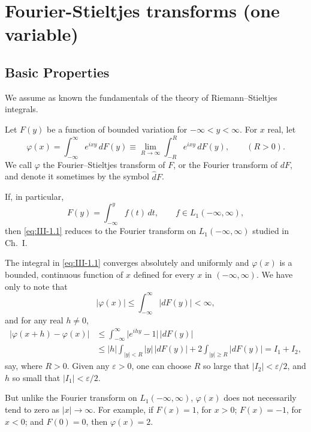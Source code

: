 \chapter{Fourier-Stieltjes transforms (one variable)}
\label{ch:III}

\section{Basic Properties}
\label{sec:III-1}

We assume as known the fundamentals of the theory of Riemann--Stieltjes integrals.

Let $F(y)$ be a function of bounded variation for $-\infty<y<\infty$. For $x$ real, let
\begin{equation}\tag{1.1}\label{eq:III-1.1}
\varphi(x)=\int_{-\infty}^{\infty}e^{ixy}\,dF(y)\equiv\lim_{R\to\infty}\int_{-R}^{R}e^{ixy}\,dF(y),\qquad(R>0).
\end{equation}
We call $\varphi$ the Fourier--Stieltjes transform of $F$, or the Fourier transform of $dF$, and denote it sometimes by the symbol $\hat dF$.

If, in particular,
\begin{equation}\tag{1.2}\label{eq:III-1.2}
F(y)=\int_{-\infty}^{y}f(t)\,dt,\qquad f\in L_{1}(-\infty,\infty),
\end{equation}
then \eqref{eq:III-1.1} reduces to the Fourier transform on $L_{1}(-\infty,\infty)$ studied in Ch.~I.

The integral in \eqref{eq:III-1.1} converges absolutely and uniformly and $\varphi(x)$ is a bounded, continuous function of $x$ defined for every $x$ in $(-\infty,\infty)$. We have only to note that
\[
\bigl|\varphi(x)\bigr|\le\int_{-\infty}^{\infty}\bigl|dF(y)\bigr|<\infty,
\]
and for any real $h\neq0$,
\begin{align*}
\bigl|\varphi(x+h)-\varphi(x)\bigr|
&\le\int_{-\infty}^{\infty}\bigl|e^{ihy}-1\bigr|\,\bigl|dF(y)\bigr|\\
&\le|h|\int_{|y|<R}|y|\,\bigl|dF(y)\bigr|+2\int_{|y|\ge R}\bigl|dF(y)\bigr|=I_{1}+I_{2},
\end{align*}
say, where $R>0$. Given any $\varepsilon>0$, one can choose $R$ so large that $|I_{2}|<\varepsilon/2$, and $h$ so small that $|I_{1}|<\varepsilon/2$.

But unlike the Fourier transform on $L_{1}(-\infty,\infty)$, $\varphi(x)$ does not necessarily tend to zero as $|x|\to\infty$. For example, if $F(x)=1$, for $x>0$; $F(x)=-1$, for $x<0$; and $F(0)=0$, then $\varphi(x)=2$.

